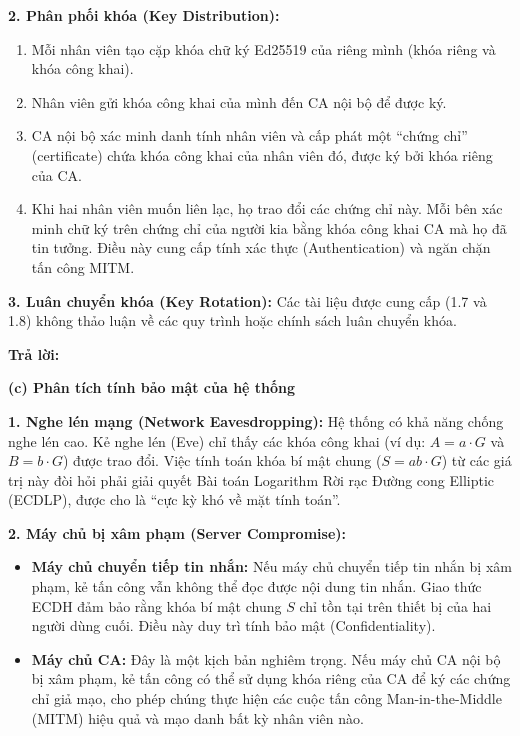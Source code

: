\textbf{2. Phân phối khóa (Key Distribution):}

\begin{enumerate}
    \item Mỗi nhân viên tạo cặp khóa chữ ký Ed25519 của riêng mình (khóa riêng và khóa công khai).
    
    \item Nhân viên gửi khóa công khai của mình đến CA nội bộ để được ký.
    
    \item CA nội bộ xác minh danh tính nhân viên và cấp phát một ``chứng chỉ'' (certificate) chứa khóa công khai của nhân viên đó, được ký bởi khóa riêng của CA.
    
    \item Khi hai nhân viên muốn liên lạc, họ trao đổi các chứng chỉ này. Mỗi bên xác minh chữ ký trên chứng chỉ của người kia bằng khóa công khai CA mà họ đã tin tưởng. Điều này cung cấp tính xác thực (Authentication) và ngăn chặn tấn công MITM.
\end{enumerate}

\textbf{3. Luân chuyển khóa (Key Rotation):} Các tài liệu được cung cấp (1.7 và 1.8) không thảo luận về các quy trình hoặc chính sách luân chuyển khóa.

\begin{center}
    \textbf{Trả lời:}
\end{center}

\textbf{(c) Phân tích tính bảo mật của hệ thống}

\textbf{1. Nghe lén mạng (Network Eavesdropping):} Hệ thống có khả năng chống nghe lén cao. Kẻ nghe lén (Eve) chỉ thấy các khóa công khai (ví dụ: $A = a \cdot G$ và $B = b \cdot G$) được trao đổi. Việc tính toán khóa bí mật chung ($S = ab \cdot G$) từ các giá trị này đòi hỏi phải giải quyết Bài toán Logarithm Rời rạc Đường cong Elliptic (ECDLP), được cho là ``cực kỳ khó về mặt tính toán''.

\textbf{2. Máy chủ bị xâm phạm (Server Compromise):}

\begin{itemize}
    \item \textbf{Máy chủ chuyển tiếp tin nhắn:} Nếu máy chủ chuyển tiếp tin nhắn bị xâm phạm, kẻ tấn công vẫn không thể đọc được nội dung tin nhắn. Giao thức ECDH đảm bảo rằng khóa bí mật chung $S$ chỉ tồn tại trên thiết bị của hai người dùng cuối. Điều này duy trì tính bảo mật (Confidentiality).
    
    \item \textbf{Máy chủ CA:} Đây là một kịch bản nghiêm trọng. Nếu máy chủ CA nội bộ bị xâm phạm, kẻ tấn công có thể sử dụng khóa riêng của CA để ký các chứng chỉ giả mạo, cho phép chúng thực hiện các cuộc tấn công Man-in-the-Middle (MITM) hiệu quả và mạo danh bất kỳ nhân viên nào.
\end{itemize}

